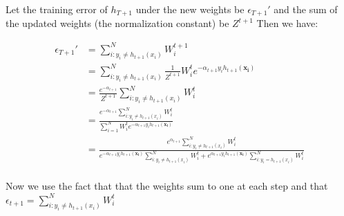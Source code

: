 \documentclass[a4paper,12pt]{article}
\begin{document}
Let the training error of $h_{T+1}$ under the new weights be $\epsilon_{T+1}'$ and the sum of the updated weights (the normalization constant) be $Z^{t+1}$ Then we have:   

$$
\begin{aligned} 
	\epsilon_{T+1}' &= 
	\sum_{i: y_i \neq h_{t+1}(x_i) }^N W_i^{t+1} \\ 
	&= \sum_{i: y_i \neq h_{t+1}(x_i) }^N
	\frac{1}{Z^{t+1}} W_i^{t} e^{
		-\alpha_{t+1}y_ih_{t+1}(\mathbf{x_i}) } \\
	&= \frac{e^{-\alpha_{t+1}}}{Z^{t+1}} 
	\sum_{i: y_i \neq h_{t+1}(x_i) }^N W_i^t \\
	&= \frac{e^{-\alpha_{t+1}} \sum_{i: y_i \neq h_{t+1}(x_i) }^N W_i^t}{\sum_{i = 1 }^N W_i^{t} 
		e^{-\alpha_{t+1}y_ih_{t+1}(\mathbf{x_i}) } } \\ 
	&= \frac{e^{\alpha_{t+1}} \sum_{i: y_i \neq h_{t+1}(x_i) }^N W_i^t}
	{e^{-\alpha_{t+1}y_ih_{t+1}(\mathbf{x_i}) } \sum_{i: y_i \neq h_{t+1}(x_i)}^N W_i^t + e^{\alpha_{t+1}y_ih_{t+1}(\mathbf{x_i}) } \sum_{i: y_i = h_{t+1}(x_i)}^N W_i^t }  \\ 
\end{aligned} 
$$

Now we use the fact that that the weights sum to one at each step and that $\epsilon_{t+1} = \sum_{i: y_i \neq h_{t+1}(x_i)}^N W_i^t$ 
\end{document}
